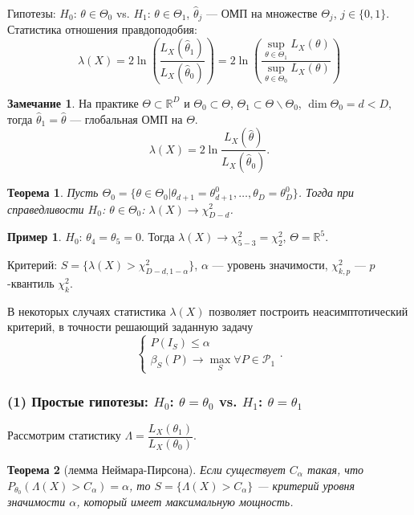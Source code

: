 \documentclass[12pt]{report}
\newtheorem{theorem}{Теорема}
\theoremstyle{definition}
\newtheorem{example}{Пример}
\newtheorem{remark}{Замечание}
\begin{document}
Гипотезы: $H_0$: $\theta \in \Theta_0$ vs. $H_1$: $\theta \in \Theta_1$, $\hat{\theta}_j$ — ОМП на множестве $\Theta_j$, $j \in \{0, 1\}$. Статистика отношения правдоподобия:
$$\lambda(X) = 2\ln\left(\dfrac{L_X(\hat{\theta}_1)}{L_X(\hat{\theta}_0)}\right) = 2\ln\left(\dfrac{\displaystyle{\sup_{\theta \in \Theta_1}}L_X(\theta)}{\displaystyle{\sup_{\theta \in \Theta_0}}L_X(\theta)}\right)$$
\begin{remark}
	На практике $\Theta \subset \mathbb{R}^D$ и $\Theta_0 \subset \Theta$, $\Theta_1 \subset \Theta \backslash \Theta_0$, $\dim \Theta_0 = d < D$, тогда $\hat{\theta}_1 = \hat{\theta}$ — глобальная ОМП на $\Theta$.
	$$\lambda(X) = 2\ln \dfrac{L_X(\hat{\theta})}{L_X(\hat{\theta}_0)}.$$
\end{remark}
\begin{theorem}
	Пусть $\Theta_0 = \{\theta \in \Theta_0| \theta_{d+1} = \theta_{d+1}^0, \ldots, \theta_{D} = \theta_{D}^0\}$. Тогда при справедливости $H_0$: $\theta \in \Theta_0$: $\lambda(X) \rightarrow \chi^2_{D-d}$.
\end{theorem}
\begin{example}
	$H_0$: $\theta_4 = \theta_5 = 0$. Тогда $\lambda(X) \rightarrow \chi^2_{5-3} = \chi^2_2$, $\Theta = \mathbb{R}^5$.
\end{example}
Критерий: $S = \{\lambda(X) > \chi^2_{D-d, 1-\alpha}\}$, $\alpha$ — уровень значимости, $\chi^2_{k,p}$ — $p$-квантиль $\chi^2_k$.

В некоторых случаях статистика $\lambda(X)$ позволяет построить неасимптотический критерий, в точности решающий заданную задачу
$$
\begin{cases}
	P(I_S) \leqslant \alpha \\
	\beta_S(P) \rightarrow \displaystyle{\max_S} \forall P \in \mathscr{P}_1
\end{cases}.
$$

\subsubsection{(1) Простые гипотезы: $H_0$: $\theta = \theta_0$ vs. $H_1$: $\theta = \theta_1$}
Рассмотрим статистику $\Lambda = \dfrac{L_X(\theta_1)}{L_X(\theta_0)}$.
\begin{theorem}[лемма Неймара-Пирсона]
	Если существует $C_\alpha$ такая, что $P_{\theta_0}(\Lambda(X) > C_\alpha) = \alpha$, то $S = \{\Lambda(X) > C_\alpha\}$ — критерий уровня значимости $\alpha$, который имеет максимальную мощность.
\end{theorem}
\end{document}
